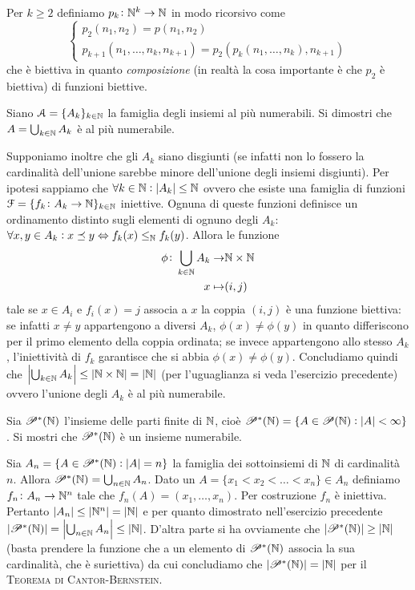 \textsf{Per $ k \geq 2 $ definiamo $ p_k \colon \mathbb{N}^k \to \mathbb{N} $ in modo ricorsivo come
  \[\begin{cases}
      p_2(n_1, n_2) = p(n_1, n_2) \\
      p_{k + 1}(n_1, \dots, n_k, n_{k + 1}) = p_2(p_{k}(n_1, \dots, n_k), n_{k + 1})
    \end{cases}\]
  che è biettiva in quanto \emph{composizione} (in realtà la cosa importante è che $ p_2 $ è biettiva) di funzioni biettive.}

\begin{es}
  Siano $ \mathcal{A} = \{A_k\}_{k \in \mathbb{N}} $ la famiglia degli insiemi al più numerabili. Si dimostri che $ A = \nolinebreak \bigcup_{k \in \N} A_k $ è al più numerabile.
\end{es}

Supponiamo inoltre che gli $ A_k $ siano disgiunti (se infatti non lo fossero la cardinalità dell'unione sarebbe minore dell'unione degli insiemi disgiunti). Per ipotesi sappiamo che $ \forall k \in \mathbb{N} : |A_k| \leq \mathbb{N} $ ovvero che esiste una famiglia di funzioni $ \mathcal{F} = \{f_k \colon A_k \to \mathbb{N}\}_{k \in \mathbb{N}} $ iniettive. Ognuna di queste funzioni definisce un ordinamento distinto sugli elementi di ognuno degli $ A_k $: $ \forall x, y \in A_k : x \preceq y \Leftrightarrow f_k(x) \leq_{\mathbb{N}} f_k(y) $. Allora le funzione
\begin{align*}
  \phi \colon \bigcup_{k \in \mathbb{N}} A_k \to & \mathbb{N} \times \mathbb{N} \\
  x \mapsto & (i, j)
\end{align*}
tale se $ x \in A_i $ e $ f_i(x) = j $ associa a $ x $ la coppia $ (i, j) $ è una funzione biettiva: se infatti $ x \neq y $ appartengono a diversi $ A_k $, $ \phi(x) \neq \phi(y) $ in quanto differiscono per il primo elemento della coppia ordinata; se invece appartengono allo stesso $ A_k $, l'iniettività di $ f_k $ garantisce che si abbia $ \phi(x) \neq \phi(y) $. Concludiamo quindi che $ \left|\bigcup_{k \in \mathbb{N}}A_k\right| \leq |\mathbb{N} \times \mathbb{N}| = |\mathbb{N}| $ (per l'uguaglianza si veda l'esercizio precedente) ovvero l'unione degli $ A_k $ è al più numerabile.

\begin{es}
  Sia $ \mathscr{P}^*(\mathbb{N}) $ l'insieme delle parti finite di $ \mathbb{N} $, cioè $ \mathscr{P}^*(\mathbb{N}) = \{A \in \mathscr{P}(\mathbb{N}) : |A| < \infty\} $. Si mostri che $ \mathscr{P}^*(\mathbb{N}) $ è un insieme numerabile.
\end{es}
Sia $ A_n = \{A \in \mathscr{P}^*(\mathbb{N}) : |A| = n\} $ la famiglia dei sottoinsiemi di $ \mathbb{N} $ di cardinalità $ n $. Allora $ \mathscr{P}^*(\mathbb{N}) = \bigcup_{n \in \mathbb{N}} A_n $. Dato un $ A = \{x_1 < x_2 < \dots < x_n\} \in A_n $ definiamo $ f_n \colon A_n \to \mathbb{N}^n $ tale che $ f_n(A) = (x_1, \dots, x_n) $. Per costruzione $ f_n $ è iniettiva. Pertanto $ |A_n| \leq |\mathbb{N}^n| = |\mathbb{N}| $ e per quanto dimostrato nell'esercizio precedente $ |\mathscr{P}^*(\mathbb{N})| = \left|\bigcup_{n \in \mathbb{N}} A_n\right| \leq |\mathbb{N}| $. D'altra parte si ha ovviamente che $ |\mathscr{P}^*(\mathbb{N})| \geq |\mathbb{N}| $ (basta prendere la funzione che a un elemento di $ \mathscr{P}^*(\mathbb{N}) $ associa la sua cardinalità, che è suriettiva) da cui concludiamo che $ |\mathscr{P}^*(\mathbb{N})| = |\mathbb{N}| $ per il \textsc{Teorema di Cantor-Bernstein}.

